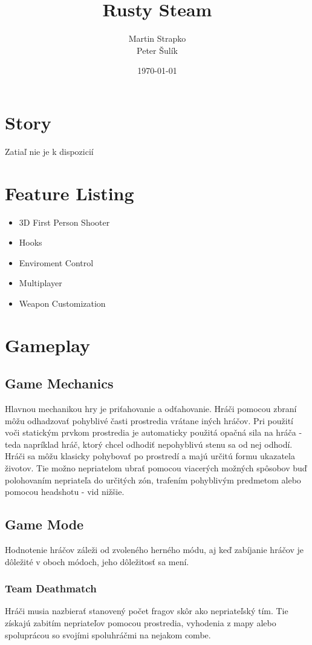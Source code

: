 \documentclass[a4paper]{report}
\title{Rusty Steam}
\author{Martin Strapko \\ Peter Šulík}
\date{\today}
\begin{document}
\maketitle

\tableofcontents
 
\chapter{Story}
Zatiaľ nie je k dispozicií
 
\chapter{Feature Listing}
\begin{itemize}
  \item 3D First Person Shooter
  \item Hooks
  \item Enviroment Control
  \item Multiplayer
  \item Weapon Customization
\end{itemize}

\chapter{Gameplay}
\section{Game Mechanics}
 Hlavnou mechanikou hry je priťahovanie a odťahovanie. Hráči pomocou zbraní môžu odhadzovať pohyblivé časti prostredia vrátane iných hráčov. Pri použití voči statickým prvkom prostredia je automaticky použitá opačná sila na hráča - teda napríklad hráč, ktorý chcel odhodiť nepohyblivú stenu sa od nej odhodí. Hráči sa môžu klasicky pohybovať po prostredí a majú určitú formu ukazatela životov. Tie možno nepriatelom ubrať pomocou viacerých možných spôsobov buď polohovaním nepriateľa do určitých zón, trafením pohyblivým predmetom alebo pomocou headshotu - vid nižšie.  

\section{Game Mode}
Hodnotenie hráčov záleži od zvoleného herného módu, aj keď zabíjanie hráčov je dôležité v oboch módoch, jeho dôležitosť sa mení.
\subsection{Team Deathmatch}
Hráči musia nazbierať stanovený počet fragov skôr ako nepriateľský tím. Tie získajú zabitím nepriateľov pomocou prostredia, vyhodenia z mapy alebo spoluprácou so svojími spoluhráčmi na nejakom combe.
\end{document}
